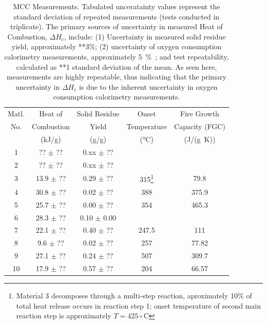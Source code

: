 \begin{table}
\begin{center}
\caption[MCC Measurements]{MCC Measurements. Tabulated unceratainty values represent the standard deviation of repeated measurements (tests conducted in triplicate). The primary sources of uncertainty in measured Heat of Combustion, $\Delta H_c$, include: (1) Uncertainty in measured solid residue yield, approximately **3\%; (2) uncertainty of oxygen consumption calorimetry measurements, approximately 5~\%~\cite{Huggett:1}; and test repeatability, calculated as **1 standard deviation of the mean. As seen here, measurements are highly repeatable, thus indicating that the primary uncertainty in $\Delta H_c$ is due to the inherent uncertainty in oxygen consumption calorimetry measurements.}
\label{MCC}
\begin{tabular}{ccccc}
\hline
Matl.  & Heat of        & Solid Residue    & Onset              & Fire Growth                   \\
No.    & Combustion     & Yield            & Temperature        & Capacity (FGC)          \\
       & (kJ/g)         & (g/g)            & (°C)               & (J/(g~K))    \\
\hline
1      &  ?? $\pm$ ??   & 0.xx $\pm$ ??    &                    &              \\
2      &  ?? $\pm$ ??   & 0.xx $\pm$ ??    &                    &              \\
3      &  13.9 $\pm$ ?? & 0.29 $\pm$ ??    &      315\footnote{Material 3 decomposes through a multi-step reaction, aproximately 10\% of total heat release occurs in reaction step 1; onset temperature of second main reaction step is approximately $T = 425\circ$C}     	& 79.8             \\
4      &  30.8 $\pm$ ?? & 0.02 $\pm$ ??    &     388         	& 375.9             \\
5      &  25.7 $\pm$ ?? & 0.00 $\pm$ ??    &       354             &       465.3       \\
6      &  28.3 $\pm$ ?? & 0.10 $\pm$ 0.00  &                    &              \\
7      &  22.1 $\pm$ ?? & 0.40 $\pm$ ??    &         247.5           &  111            \\
8      &  9.6 $\pm$ ??  & 0.02 $\pm$ ??    &        257            &   77.82           \\
9      &  27.1 $\pm$ ?? & 0.24 $\pm$ ??    &       507             & 309.7             \\
10     &  17.9 $\pm$ ?? & 0.57 $\pm$ ??    &       204             &  66.57            \\
\hline
\end{tabular}
\end{center}
\end{table}


